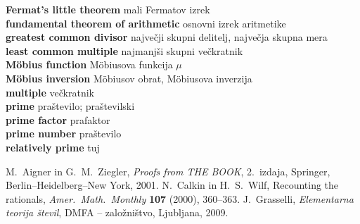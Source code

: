 \documentclass[a4paper,12pt]{article}
\newcommand{\geslo}[2]{\noindent\textbf{#1} \quad \hangindent=1cm #2\\[-1pc]}
\begin{document}
\geslo{Fermat's little theorem}{mali Fermatov izrek}

\geslo{fundamental theorem of arithmetic}{osnovni izrek aritmetike}

\geslo{greatest common divisor}{največji skupni delitelj, največja skupna mera}

\geslo{least common multiple}{najmanjši skupni večkratnik}

\geslo{M\"obius function}{M\"obiusova funkcija $\mu$}

\geslo{M\"obius inversion}{M\"obiusov obrat, M\"obiusova inverzija}

\geslo{multiple}{večkratnik}

\geslo{prime}{praštevilo; praštevilski}

\geslo{prime factor}{prafaktor}

\geslo{prime number}{praštevilo}

\geslo{relatively prime}{tuj}




\begin{thebibliography}{1}
M.~Aigner in G.~M.~Ziegler, \emph{Proofs from THE BOOK}, 2.\ izdaja, Springer, Berlin--Heidelberg--New York, 2001.
N.~Calkin in H.~S.~Wilf, Recounting the rationals,
\emph{Amer.~Math.~Monthly}  \textbf{107}  (2000),  360--363.
J.~Grasselli, \emph{Elementarna teorija števil}, DMFA -- založništvo, Ljubljana, 2009.
\end{thebibliography}
\end{document}
